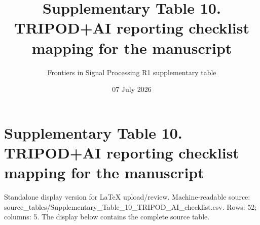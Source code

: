 \documentclass[11pt]{article}
\title{Supplementary Table 10. TRIPOD+AI reporting checklist mapping for the manuscript}
\author{Frontiers in Signal Processing R1 supplementary table}
\date{07 July 2026}
\begin{document}
\maketitle

\section*{Supplementary Table 10. TRIPOD+AI reporting checklist mapping for the manuscript}

Standalone display version for LaTeX upload/review. Machine-readable source: source\_\allowbreak{}tables/\allowbreak{}Supplementary\_\allowbreak{}Table\_\allowbreak{}10\_\allowbreak{}TRIPOD\_\allowbreak{}AI\_\allowbreak{}checklist.\allowbreak{}csv. Rows: 52; columns: 5. The display below contains the complete source table.
\end{document}
